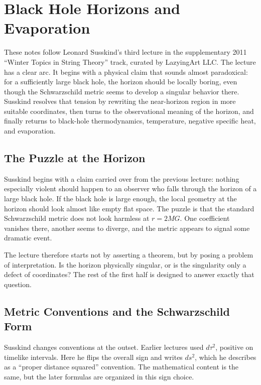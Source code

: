 \chapter{Black Hole Horizons and Evaporation}

These notes follow Leonard Susskind's third lecture in the supplementary 2011 ``Winter Topics in String Theory'' track, curated by LazyingArt LLC. The lecture has a clear arc. It begins with a physical claim that sounds almost paradoxical: for a sufficiently large black hole, the horizon should be locally boring, even though the Schwarzschild metric seems to develop a singular behavior there. Susskind resolves that tension by rewriting the near-horizon region in more suitable coordinates, then turns to the observational meaning of the horizon, and finally returns to black-hole thermodynamics, temperature, negative specific heat, and evaporation.

\section{The Puzzle at the Horizon}

Susskind begins with a claim carried over from the previous lecture: nothing especially violent should happen to an observer who falls through the horizon of a large black hole. If the black hole is large enough, the local geometry at the horizon should look almost like empty flat space. The puzzle is that the standard Schwarzschild metric does not look harmless at \(r=2MG\). One coefficient vanishes there, another seems to diverge, and the metric appears to signal some dramatic event.

The lecture therefore starts not by asserting a theorem, but by posing a problem of interpretation. Is the horizon physically singular, or is the singularity only a defect of coordinates? The rest of the first half is designed to answer exactly that question.

\section{Metric Conventions and the Schwarzschild Form}

Susskind changes conventions at the outset. Earlier lectures used \(d\tau^2\), positive on timelike intervals. Here he flips the overall sign and writes \(ds^2\), which he describes as a ``proper distance squared'' convention. The mathematical content is the same, but the later formulas are organized in this sign choice.

